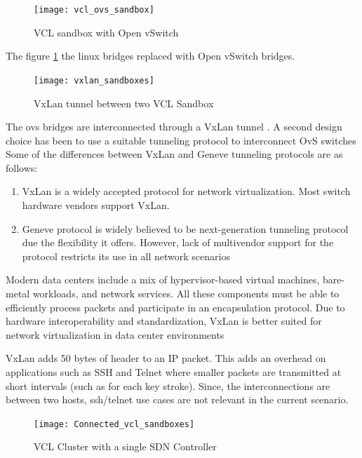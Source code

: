 \documentclass[12pt]{extarticle}
\begin{document}
\begin{figure}[H]
\centering
\texttt{[image: vcl\_ovs\_sandbox]}
\caption{VCL sandbox with Open vSwitch}
\label{fig:vclovs}
\end{figure}

The figure \ref{fig:vclovs} the linux bridges replaced with Open vSwitch bridges. 

\begin{figure}[H]
\centering
\texttt{[image: vxlan\_sandboxes]}
\caption{VxLan tunnel between two VCL Sandbox}
\label{fig:vclvxlan}
\end{figure}

The ovs bridges are interconnected through a VxLan tunnel \cite{mahalingam2012vxlan}. A second design choice has been to use a suitable tunneling protocol to interconnect OvS switches
Some of the differences between VxLan and Geneve tunneling protocols are as follows:
\begin{enumerate}
    \item VxLan is a widely accepted protocol for network virtualization. Most switch hardware vendors support VxLan. 
    \item Geneve protocol is widely believed to be next-generation tunneling protocol due the flexibility it offers. However, lack of multivendor support for the protocol restricts its use in all network scenarios
    
\end{enumerate}
Modern data centers include a mix of hypervisor-based virtual machines, bare-metal workloads, and network services. All these components must be able to efficiently process packets and participate in an encapsulation protocol. Due to hardware interoperability and standardization, VxLan is better suited for network virtualization in data center environments

VxLan adds 50 bytes of header to an IP packet. This adds an overhead on applications such as SSH and Telnet where smaller packets are transmitted at short intervals (such as for each key stroke). Since, the interconnections are between two hosts, ssh/telnet use cases are not relevant in the current scenario.

\begin{figure}[H]
\centering
\texttt{[image: Connected\_vcl\_sandboxes]}
\caption{VCL Cluster with a single SDN Controller}
\label{fig:vclconnected}
\end{figure}
\end{document}
